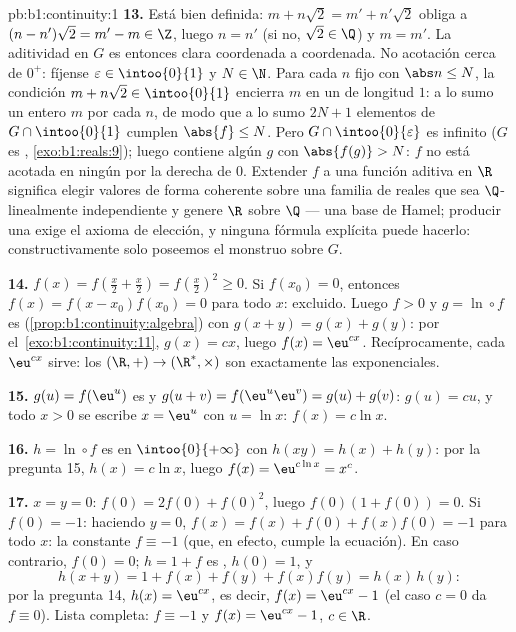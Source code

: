\begin{solution}{pb:b1:continuity:1}
\textbf{13.} Está bien definida: $m + n\sqrt2 = m' + n'\sqrt2$ obliga
a $(n - n')\sqrt2 = m' - m \in \Z$, luego $n = n'$ (si no,
$\sqrt2 \in \Q$) y $m = m'$. La aditividad en $G$ es entonces clara
coordenada a coordenada. No acotación cerca de $0^+$: fíjense
$\varepsilon \in \intoo{0}{1}$ y $N \in \N$. Para cada $n$ fijo con
$\abs n \leq N$, la condición $m + n\sqrt2 \in \intoo{0}{1}$ encierra
$m$ en un  de longitud $1$: a lo sumo un entero $m$ por cada
$n$, de modo que a lo sumo $2N + 1$ elementos de
$G \cap \intoo{0}{1}$ cumplen $\abs{f} \leq N$. Pero
$G \cap \intoo{0}{\varepsilon}$ es infinito ($G$ es ,
\cref{exo:b1:reals:9}); luego contiene algún $g$ con
$\abs{f(g)} > N$: $f$ no está acotada en ningún  por la
derecha de $0$. Extender $f$ a una función aditiva en $\R$ significa
elegir valores de forma coherente sobre una familia de reales que sea
$\Q$-linealmente independiente y genere $\R$ sobre $\Q$ --- una base
de Hamel; producir una exige el axioma de elección, y ninguna fórmula
explícita puede hacerlo: constructivamente solo poseemos el monstruo
sobre $G$.

\textbf{14.} $f(x) = f(\frac x2 + \frac x2) = f(\frac x2)^2 \geq 0$.
Si $f(x_0) = 0$, entonces $f(x) = f(x - x_0)f(x_0) = 0$ para todo
$x$: excluido. Luego $f > 0$ y $g = \ln \circ f$ es 
(\cref{prop:b1:continuity:algebra}) con $g(x + y) = g(x) + g(y)$: por
el~\cref{exo:b1:continuity:11}, $g(x) = cx$, luego $f(x) = \eu^{cx}$.
Recíprocamente, cada $\eu^{cx}$ sirve: los  
$(\R, +) \to (\R^*, \times)$ son exactamente las exponenciales.

\textbf{15.} $g(u) = f(\eu^u)$ es  y
$g(u + v) = f(\eu^u \eu^v) = g(u) + g(v)$: $g(u) = cu$, y todo
$x > 0$ se escribe $x = \eu^u$ con $u = \ln x$: $f(x) = c\ln x$.

\textbf{16.} $h = \ln \circ f$ es  en $\intoo{0}{+\infty}$
con $h(xy) = h(x) + h(y)$: por la pregunta 15, $h(x) = c\ln x$, luego
$f(x) = \eu^{c\ln x} = x^c$.

\textbf{17.} $x = y = 0$: $f(0) = 2f(0) + f(0)^2$, luego
$f(0)(1 + f(0)) = 0$. Si $f(0) = -1$: haciendo $y = 0$,
$f(x) = f(x) + f(0) + f(x)f(0) = -1$ para todo $x$: la constante
$f \equiv -1$ (que, en efecto, cumple la ecuación). En caso
contrario, $f(0) = 0$; $h = 1 + f$ es , $h(0) = 1$, y
\[
h(x + y) = 1 + f(x) + f(y) + f(x)f(y) = h(x)\,h(y) :
\]
por la pregunta 14, $h(x) = \eu^{cx}$, es decir,
$f(x) = \eu^{cx} - 1$ (el caso $c = 0$ da $f \equiv 0$). Lista
completa: $f \equiv -1$ y $f(x) = \eu^{cx} - 1$, $c \in \R$.


\end{solution}
